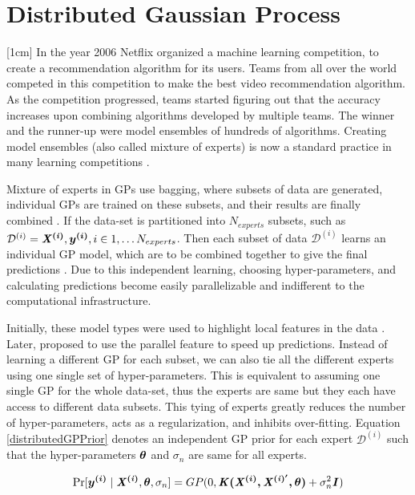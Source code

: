 \section{Distributed Gaussian Process}\label{secDgp}
[1cm]
In the year 2006 Netflix organized a machine learning competition, to create a recommendation algorithm for its users. Teams from all over the world competed in this competition to make the best video recommendation algorithm. As the competition progressed, teams started figuring out that the accuracy increases upon combining algorithms developed by multiple teams. The winner and the runner-up were model ensembles of hundreds of algorithms. Creating model ensembles (also called mixture of experts) is now a standard practice in many learning competitions \cite{bauer1998empirical}. 

Mixture of experts in GPs use bagging, where subsets of data are generated, individual GPs are trained on these subsets, and their results are finally combined \cite{chen2009bagging}. If the data-set is partitioned  into $N_{experts}$ subsets, such as $\mathcal{D}^{(i)} = {\bm{\mathit{X^{(i)}}}, \boldsymbol{y^{(i)}}}, i \in 1, \ldots N_{experts}$. Then each subset of data $\mathcal{D}^{(i)}$ learns an individual GP model, which are to be combined together to give the final predictions . Due to this independent learning, choosing hyper-parameters, and calculating predictions become easily parallelizable and indifferent to the computational infrastructure. 

\sloppy Initially, these model types were used to highlight local features in the data \cite{rasmussen2002infinite}. Later,  \cite{ng2014hierarchical} proposed to use the parallel feature to speed up predictions. Instead of learning a different GP for each subset, we can also tie all the different experts using one single set of hyper-parameters. This is equivalent to assuming one single GP for the whole data-set, thus the experts are same but they each have access to different data subsets. This tying of experts greatly reduces the number of hyper-parameters, acts as a regularization, and inhibits over-fitting. Equation \ref{distributedGPPrior} denotes an independent GP prior for each expert $\mathcal{D}^{(i)}$ such that the hyper-parameters $\boldsymbol{\theta}$ and $\sigma_{n}$ are same for all experts.

\begin{equation}\label{distributedGPPrior}
    \Pr[\boldsymbol{y^{(i)}} \mid \bm{\mathit{X^{(i)}}}, \boldsymbol{\theta}, \sigma_{n}] = GP(0, \bm{\mathit{K(\boldsymbol{X^{(i)}}, X^{(i)'}, \theta)}} + \sigma^{2}_{n}\bm{\mathit{I}}) 
\end{equation}

